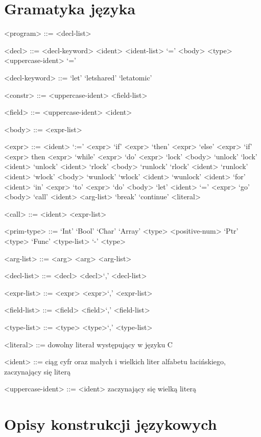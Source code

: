 \documentclass{documentation}
\begin{document}
\section{Gramatyka języka}
\begin{grammar}

<program> ::= <decl-list>

<decl> ::= <decl-keyword> <ident> <ident-list> `=' <body>
\alt <type> <uppercase-ident> `=' 

<decl-keyword> ::= `let'
\alt `letshared'
\alt `letatomic'

<constr> ::= <uppercase-ident> <field-list>

<field> ::= <uppercase-ident> <ident>

<body> ::= <expr-list>

<expr> ::= <ident> `:=' <expr>
\alt `if' <expr> `then' <expr> `else' <expr>
\alt `if' <expr> then <expr>
\alt `while' <expr> `do' <expr>
\alt `lock' <body> `unlock'
\alt `lock' <ident>
\alt `unlock' <ident>
\alt `rlock' <body> `runlock'
\alt `rlock' <ident>
\alt `runlock' <ident>
\alt `wlock' <body> `wunlock'
\alt `wlock' <ident>
\alt `wunlock' <ident>
\alt `for' <ident> `in' <expr> `to' <expr> `do' <body>
\alt `let' <ident> `=' <expr>
\alt `go' <body>
\alt `call' <ident> <arg-list>
\alt `break'
\alt `continue'
\alt <literal>

<call> ::= <ident> <expr-list>

<prim-type> ::= `Int'
\alt `Bool'
\alt `Char'
\alt `Array' <type> <positive-num>
\alt `Ptr' <type>
\alt `Func' <type-list> `-\>' <type>

<arg-list> ::= <arg>
\alt <arg> <arg-list>

<decl-list> ::= <decl>
\alt <decl>`,' <decl-list>

<expr-list> ::= <expr>
\alt <expr>`,' <expr-list>

<field-list> ::= <field>
\alt <field>`,' <field-list>

<type-list> ::= <type>
\alt <type>`,' <type-list>

<literal> ::= dowolny literał występujący w języku C

<ident> ::= ciąg cyfr oraz małych i wielkich liter alfabetu łacińskiego, zaczynający się literą

<uppercase-ident> ::= <ident> zaczynający się wielką literą

\end{grammar}

\section{Opisy konstrukcji językowych}
\end{document}
